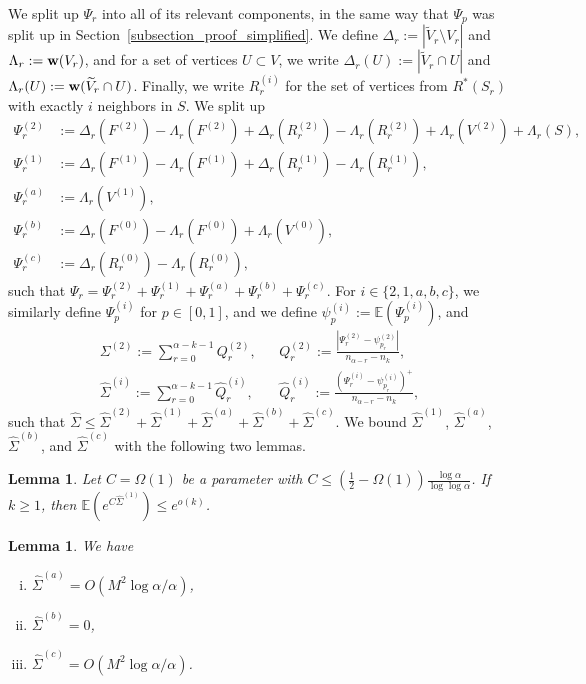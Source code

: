 \documentclass{article}
\theoremstyle{plain}
\theoremstyle{remark}
\theoremstyle{plain}
\newtheorem{lemma}[theorem]{Lemma}
\numberwithin{equation}{section}
\renewcommand{\b}{{\bf{w}}}
\begin{document}
	We split up $\Psi_r$ into all of its relevant components, in the same way that $\Psi_p$ was split up in Section~\ref{subsection_proof_simplified}. We define $\Delta_r:=|\widetilde{V}_r\setminus V_r|$ and $\Lambda_r:=\b(V_r)$, and for a set of vertices $U\subset V$, we write $\Delta_r(U):=|\widetilde{V}_r\cap U|$ and $\Lambda_r(U):=\b(\widetilde{V}_r\cap U)$. Finally, we write $R_r^{(i)}$ for the set of vertices from $R^*(S_r)$ with exactly $i$ neighbors in $S$. We split up
	\begin{align}
		\Psi_r^{(2)}&:=\Delta_r(F^{(2)})-\Lambda_r(F^{(2)})+\Delta_r(R_r^{(2)})-\Lambda_r(R_r^{(2)})+\Lambda_r(V^{(2)})+\Lambda_r(S),
		\\\Psi_r^{(1)}&:=\Delta_r(F^{(1)})-\Lambda_r(F^{(1)})+\Delta_r(R_r^{(1)})-\Lambda_r(R_r^{(1)}),
		\\\Psi_r^{(a)}&:=\Lambda_r(V^{(1)}),
		\\\Psi_r^{(b)}&:=\Delta_r(F^{(0)})-\Lambda_r(F^{(0)})+\Lambda_r(V^{(0)}),
		\\\Psi_r^{(c)}&:=\Delta_r(R_r^{(0)})-\Lambda_r(R_r^{(0)}),
	\end{align}
	such that $\Psi_r=\Psi_r^{(2)}+\Psi_r^{(1)}+\Psi_r^{(a)}+\Psi_r^{(b)}+\Psi_r^{(c)}$. For $i\in\{2,1,a,b,c\}$, we similarly define $\Psi_p^{(i)}$ for $p\in[0,1]$, and we define $\psi_p^{(i)}:=\mathbb{E}(\Psi_p^{(i)})$, and
	\begin{align}
		\Sigma^{(2)}:=\sum_{r=0}^{\alpha-k-1}Q_r^{(2)},&&Q_r^{(2)}:=\frac{|\Psi_r^{(2)}-\psi_{p_r}^{(2)}|}{n_{\alpha-r}-n_k},
		\\\hat{\Sigma}^{(i)}:=\sum_{r=0}^{\alpha-k-1}\hat{Q}_r^{(i)},&&\hat{Q}_r^{(i)}:=\frac{(\Psi_r^{(i)}-\psi_{p_r}^{(i)})^+}{n_{\alpha-r}-n_k},
	\end{align}
	such that $\hat{\Sigma}\leq\hat{\Sigma}^{(2)}+\hat{\Sigma}^{(1)}+\hat{\Sigma}^{(a)}+\hat{\Sigma}^{(b)}+\hat{\Sigma}^{(c)}$. We bound $\hat{\Sigma}^{(1)}$, $\hat{\Sigma}^{(a)}$, $\hat{\Sigma}^{(b)}$, and $\hat{\Sigma}^{(c)}$ with the following two lemmas.
	
	\begin{lemma}\label{lemma_sigma1hat}
		Let $C=\Omega(1)$ be a parameter with $C\leq(\frac12-\Omega(1))\frac{\log\alpha}{\log\log\alpha}$. If $k\geq1$, then $\mathbb{E}(e^{C\hat{\Sigma}^{(1)}})\leq e^{o(k)}$.
	\end{lemma}
	
	\begin{lemma}\label{lemma_sigmaihat}
		We have
		\begin{enumerate}[(i)]
			\item\label{lemma_sigmaihat_a} $\hat{\Sigma}^{(a)}=O(M^2\log\alpha/\alpha)$,
			\item\label{lemma_sigmaihat_b} $\hat{\Sigma}^{(b)}=0$,
			\item\label{lemma_sigmaihat_c} $\hat{\Sigma}^{(c)}=O(M^2\log\alpha/\alpha)$.
		\end{enumerate}
	\end{lemma}
	
\end{document}
